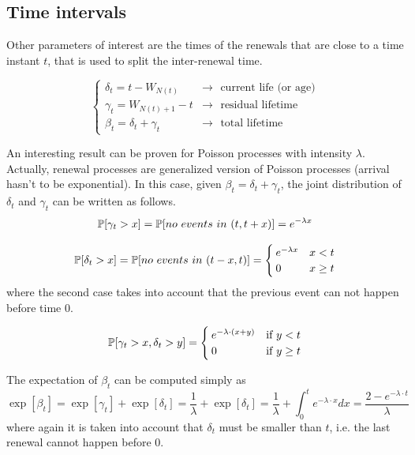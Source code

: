 \subsection{Time intervals}
	Other parameters of interest are the times of the renewals that are close to a time instant $t$, that is used to split the inter-renewal time.

	\begin{equation} \begin{cases}
		\delta_t = t - W_{N(t)} & \rightarrow
			\text{~~current life (or age)} \\
		\gamma_t = W_{N(t)+1}-t & \rightarrow
			\text{~~residual lifetime} \\
		\beta_t = \delta_t + \gamma_t & \rightarrow
			\text{~~total lifetime}
	\end{cases} \end{equation}

	\bigbreak
	An interesting result can be proven for Poisson processes with intensity $\lambda$.
	Actually, renewal processes are generalized version of Poisson processes (arrival hasn't to be exponential).
	In this case, given $\beta_t = \delta_t + \gamma_t$, the joint distribution of $\delta_t$ and $\gamma_t$ can be written as follows.
	\begin{equation*}
		\mathbb{P}[\gamma_t > x] = \mathbb{P}[no ~events ~in ~(t,t+x)] = e^{-\lambda x}
	\end{equation*}

	\begin{equation*}
		\mathbb{P}[\delta_t > x] = \mathbb{P}[no ~events ~in ~(t-x,t)] =
		\begin{cases}
			e^{-\lambda x} & x<t\\
			0 & x\ge t
		\end{cases}
	\end{equation*}
	where the second case takes into account that the previous event can not happen before time 0.

	\begin{equation}
		\mathbb{P}[\gamma_t > x, \delta_t > y ] =
		\begin{cases}
			e^{-\lambda \cdot (x+y)} & \text{if } y < t \\
			0 & \text{if } y \ge t \\
		\end{cases}
	\end{equation}

	The expectation of $\beta_t$ can be computed simply as
	\begin{equation*}
		\exp[\beta_t] = \exp[\gamma_t] + \exp[\delta_t] =
		\frac{1}{\lambda} + \exp[\delta_t] =
		\frac{1}{\lambda} + \int_0^t e^{-\lambda \cdot x} dx =
		\frac{2-e^{-\lambda \cdot t}}{\lambda}
	\end{equation*}
	where again it is taken into account that $\delta_t$ must be smaller than $t$, i.e. the last renewal cannot happen before 0.

